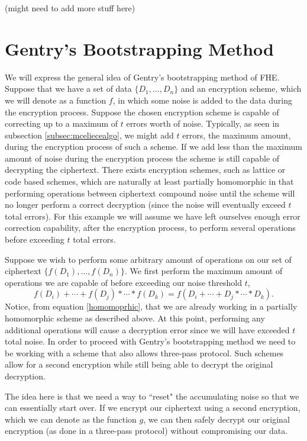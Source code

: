 \color{red} (might need to add more stuff here) \color{black}

\section{Gentry's Bootstrapping Method}

We will express the general idea of Gentry's bootstrapping method of FHE. Suppose that we have a set of data $\{D_1, \dots, D_n\}$ and an encryption scheme, which we will denote as a function $f$, in which some noise is added to the data during the encryption process. Suppose the chosen encryption scheme is capable of correcting up to a maximum of $t$ errors worth of noise. Typically, as seen in subsection \ref{subsec:mceliecealgo}, we might add $t$ errors, the maximum amount, during the encryption process of such a scheme. If we add less than the maximum amount of noise during the encryption process the scheme is still capable of decrypting the ciphertext. There exists encryption schemes, such as lattice or code based schemes, which are naturally at least partially homomorphic in that performing operations between ciphertext compound noise until the scheme will no longer perform a correct decryption (since the noise will eventually exceed $t$ total errors). For this example we will assume we have left ourselves enough error correction capability, after the encryption process, to perform several operations before exceeding $t$ total errors. 

Suppose we wish to perform some arbitrary amount of operations on our set of ciphertext $\{f(D_1), \dots, f(D_n)\}$. We first perform the maximum amount of operations we are capable of before exceeding our noise threshold $t$,
\begin{equation}\label{homomoprhic}
    f(D_i) + \cdots + f(D_j) * \cdots * f(D_k) = f(D_i + \cdots + D_j * \cdots * D_k).
\end{equation}
Notice, from equation \eqref{homomoprhic}, that we are already working in a partially homomorphic scheme as described above. At this point, performing any additional operations will cause a decryption error since we will have exceeded $t$ total noise. In order to proceed with Gentry's bootstrapping method we need to be working with a scheme that also allows three-pass protocol. Such schemes allow for a second encryption while still being able to decrypt the original decryption. 

The idea here is that we need a way to ``reset" the accumulating noise so that we can essentially start over. If we encrypt our ciphertext using a second encryption, which we can denote as the function $g$, we can then safely decrypt our original encryption (as done in a three-pass protocol) without compromising our data.

